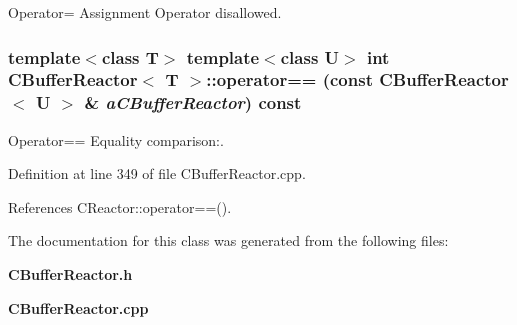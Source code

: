 Operator= Assignment Operator disallowed.

\subsubsection{\setlength{\rightskip}{0pt plus 5cm}template$<$class T$>$ template$<$class U$>$ int CBuffer\-Reactor$<$ T $>$::operator== (const CBuffer\-Reactor$<$ U $>$ \& {\em a\-CBuffer\-Reactor}) const}\label{classCBufferReactor_a4}


Operator== Equality comparison:.



Definition at line 349 of file CBuffer\-Reactor.cpp.

References CReactor::operator==().

The documentation for this class was generated from the following files:\begin{CompactItemize}
\item 
{\bf CBuffer\-Reactor.h}\item 
{\bf CBuffer\-Reactor.cpp}\end{CompactItemize}
